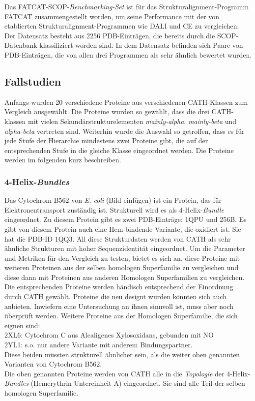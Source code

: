 \documentclass{report}
\begin{document}
Das FATCAT-SCOP-\textit{Benchmarking-Set} ist f\"ur das Strukturalignment-Programm FATCAT \cite{fatcat} zusammengestellt worden, um seine Performance mit der von etablierten Strukturalignment-Programmen wie DALI und CE zu vergleichen. Der Datensatz besteht aus 2256 PDB-Eintr\"agen, die bereits durch die SCOP-Datenbank klassifiziert worden sind.
In dem Datensatz befinden sich Paare von PDB-Eintr\"agen, die von allen drei Programmen als sehr \"ahnlich bewertet wurden. 


\subsection{Fallstudien}

Anfangs wurden 20 verschiedene Proteine aus verschiedenen CATH-Klassen zum Vergleich ausgew\"ahlt. Die Proteine wurden so gew\"ahlt, dass die drei CATH-klassen mit vielen Sekund\"arstrukturelementen \textit{mainly-alpha}, \textit{mainly-beta} und \textit{alpha-beta} vertreten sind. Weiterhin wurde die Auswahl so getroffen, dass es f\"ur jede Stufe der Hierarchie mindestens zwei Proteine gibt, die auf der entsprechenden Stufe in die gleiche Klasse eingeordnet werden. Die Proteine werden im folgenden kurz beschreiben.


\subsubsection{4-Helix-\textit{Bundles}}

Das Cytochrom B562 von \emph{E. coli} (Bild einf\"ugen) ist ein Protein, das f\"ur Elektronentransport zust\"andig ist. Strukturell wird es als 4-Helix-\textit{Bundle} eingeordnet. Zu diesem Protein gibt es zwei PDB-Eintr\"age: 1QPU und 256B. Es gibt von diesem Protein auch eine Hem-bindende Variante, die oxidiert ist. Sie hat die PDB-ID 1QQ3. All diese Strukturdaten werden von CATH als sehr \"ahnliche Strukturen mit hoher Sequenzidentit\"at eingeordnet.
Um die Parameter und Metriken f\"ur den Vergleich zu testen, bietet es sich an, diese Proteine mit weiteren Proteinen aus der selben homologen Superfamilie zu vergleichen und diese dann mit Proteinen aus anderen Homologen Superfamilien zu vergleichen. Die entsprechenden Proteine werden h\"andisch entsprechend der Einordnung durch CATH gew\"ahlt. Proteine die neu designt wurden k\"onnten sich auch anbieten. Inwiefern eine Untersuchung an ihnen sinnvoll ist, muss aber noch \"uberpr\"uft werden.
Weitere Proteine aus der Homologen Superfamilie, die sich eignen sind:\\
2XL6: Cytochrom C aus Alcaligenes Xylosoxidans, gebunden mit NO\\
2YL1: s.o. nur andere Variante mit anderem Bindungspartner.\\
Diese beiden m\"ussten strukturell \"ahnlicher sein, als die weiter oben genannten Varianten von Cytochrom B562.\\
Die oben genannten Proteine werden von CATH alle in die \emph{Topologie} der 4-Helix-\textit{Bundles} (Hemerythrin Untereinheit A) eingeordnet. Sie sind alle Teil der selben homologen Superfamilie.
\end{document}
